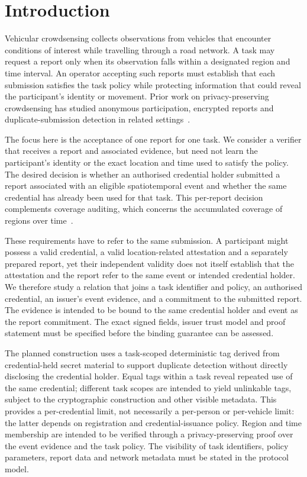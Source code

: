 \section{Introduction}

Vehicular crowdsensing collects observations from vehicles that encounter conditions of interest while travelling through a road network. A task may request a report only when its observation falls within a designated region and time interval. An operator accepting such reports must establish that each submission satisfies the task policy while protecting information that could reveal the participant's identity or movement. Prior work on privacy-preserving crowdsensing has studied anonymous participation, encrypted reports and duplicate-submission detection in related settings~\cite{Ni2020SPOON,Xu2021TaskMatching}.

The focus here is the acceptance of one report for one task. We consider a verifier that receives a report and associated evidence, but need not learn the participant's identity or the exact location and time used to satisfy the policy. The desired decision is whether an authorised credential holder submitted a report associated with an eligible spatiotemporal event and whether the same credential has already been used for that task. This per-report decision complements coverage auditing, which concerns the accumulated coverage of regions over time~\cite{He2026TSTAudit}.

These requirements have to refer to the same submission. A participant might possess a valid credential, a valid location-related attestation and a separately prepared report, yet their independent validity does not itself establish that the attestation and the report refer to the same event or intended credential holder. We therefore study a relation that joins a task identifier and policy, an authorised credential, an issuer's event evidence, and a commitment to the submitted report. The evidence is intended to be bound to the same credential holder and event as the report commitment. The exact signed fields, issuer trust model and proof statement must be specified before the binding guarantee can be assessed.

The planned construction uses a task-scoped deterministic tag derived from credential-held secret material to support duplicate detection without directly disclosing the credential holder. Equal tags within a task reveal repeated use of the same credential; different task scopes are intended to yield unlinkable tags, subject to the cryptographic construction and other visible metadata. This provides a per-credential limit, not necessarily a per-person or per-vehicle limit: the latter depends on registration and credential-issuance policy. Region and time membership are intended to be verified through a privacy-preserving proof over the event evidence and the task policy. The visibility of task identifiers, policy parameters, report data and network metadata must be stated in the protocol model.

